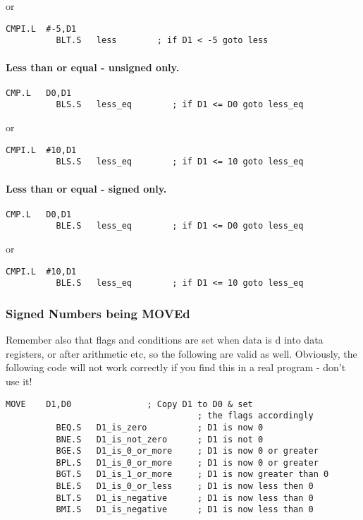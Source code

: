 or

\begin{lstlisting}[firstnumber=1,]
          CMPI.L  #-5,D1
          BLT.S   less        ; if D1 < -5 goto less
\end{lstlisting}

\paragraph{Less than or equal -{} unsigned only.}

\begin{lstlisting}[firstnumber=1,]
          CMP.L   D0,D1
          BLS.S   less_eq        ; if D1 <= D0 goto less_eq
\end{lstlisting}

or

\begin{lstlisting}[firstnumber=1,]
          CMPI.L  #10,D1
          BLS.S   less_eq        ; if D1 <= 10 goto less_eq
\end{lstlisting}

\paragraph{Less than or equal -{} signed only.}

\begin{lstlisting}[firstnumber=1,]
          CMP.L   D0,D1
          BLE.S   less_eq        ; if D1 <= D0 goto less_eq
\end{lstlisting}

or

\begin{lstlisting}[firstnumber=1,]
          CMPI.L  #10,D1
          BLE.S   less_eq        ; if D1 <= 10 goto less_eq
\end{lstlisting}

\subsubsection{Signed Numbers being MOVEd}
\label{ch5-signed-moves}%

Remember also that flags and conditions are set when data is
        d into data registers, or after arithmetic etc, so the following
        are valid as well. Obviously, the following code will not work
        correctly if you find this in a real program -{} don't use it!

\begin{lstlisting}[firstnumber=1,]
          MOVE    D1,D0               ; Copy D1 to D0 & set 
                                      ; the flags accordingly
          BEQ.S   D1_is_zero          ; D1 is now 0
          BNE.S   D1_is_not_zero      ; D1 is not 0
          BGE.S   D1_is_0_or_more     ; D1 is now 0 or greater
          BPL.S   D1_is_0_or_more     ; D1 is now 0 or greater
          BGT.S   D1_is_1_or_more     ; D1 is now greater than 0
          BLE.S   D1_is_0_or_less     ; D1 is now less then 0
          BLT.S   D1_is_negative      ; D1 is now less than 0
          BMI.S   D1_is_negative      ; D1 is now less than 0
\end{lstlisting}

